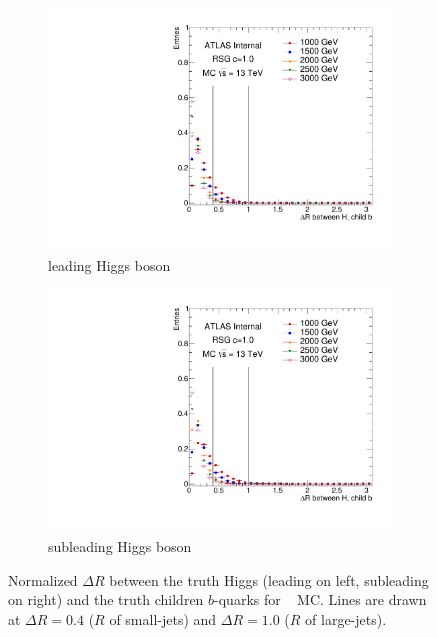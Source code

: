 \begin{figure}[htbp!]
    \captionsetup{justification=centering}
    \begin{subfigure}[b]{0.45\textwidth}
        \includegraphics[width=\textwidth,angle=-90]{figures/boosted/Truth/truth_hbdR.pdf}
        \caption{leading Higgs boson}
        \label{fig:truth-HbdR-lead}
    \end{subfigure}
    \quad
    \begin{subfigure}[b]{0.45\textwidth}
        \includegraphics[width=\textwidth,angle=-90]{figures/boosted/Truth/truth_hbdR2.pdf}
        \caption{subleading Higgs boson}
        \label{fig:truth-HbdR-subl}
    \end{subfigure}
\caption{Normalized $\Delta R$ between the truth Higgs (leading on left, subleading on right) and the truth children $b$-quarks for \Grav~ MC. Lines are drawn at $\Delta R = 0.4$ ($R$ of small-\R jets) and $\Delta R = 1.0$ ($R$ of large-\R jets). }
\label{fig:truth-HbdR}
\end{figure}

